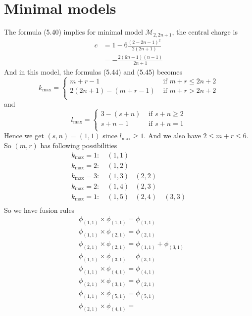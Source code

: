 \section{Minimal models}
The formula (5.40) implies for minimal model $\mathcal{M}_{2,2n+1}$, the central charge is 
\[
\begin{aligned}
c & = 1 - 6 \frac{(2-2n-1)^2}{2(2n+1)}\\
& =  - \frac{2(6n-1)(n-1)}{2n+1}
\end{aligned}
\]
And in this model, the formulas (5.44) and (5.45) becomes
\[
k_{\text{max}} = \begin{cases}
m+r -1 & \text{ if } m+r \leq 2n+2\\
2(2n+1) -(m+r-1) & \text{ if } m+r > 2n+2\\
\end{cases}
\]
and 
\[
l_{\text{max}} = \begin{cases}
3-(s+n) & \text{ if } s+n \geq 2\\
s+n-1& \text{ if } s+n = 1 \\
\end{cases}
\]
Hence we get $(s,n)= (1,1)$ since $l_{\text{max}} \geq 1$. And we also have $2 \leq m+r \leq 6$. So $(m,r)$ has following possibilities
\[
\begin{aligned}
k_{\text{max}}= 1:\ &(1,1) & &\\
k_{\text{max}}= 2:\ &(1,2) & &\\
k_{\text{max}}= 3:\ &(1,3) &(2,2)&\\
k_{\text{max}}= 2:\ &(1,4) & (2,3)&\\
k_{\text{max}}= 1:\ &(1,5) & (2,4) &\ (3,3)\\
\end{aligned}
\]
So we have fusion rules
\[
\begin{aligned}
 &\phi_{(1,1)} \times \phi_{(1,1)} = \phi_{(1,1)}\\
 & \phi_{(1,1)} \times \phi_{(2,1)} = \phi_{(2,1)}\\
 & \phi_{(2,1)} \times \phi_{(2,1)} = \phi_{(1,1)} + \phi_{(3,1)}\\
 & \phi_{(1,1)} \times \phi_{(3,1)} = \phi_{(3,1)}\\
 & \phi_{(1,1)} \times \phi_{(4,1)} = \phi_{(4,1)} \\
 & \phi_{(2,1)} \times \phi_{(3,1)} = \phi_{(2,1)} \\
 & \phi_{(1,1)} \times \phi_{(5,1)} = \phi_{(5,1)} \\
 & \phi_{(2,1)} \times \phi_{(4,1)} = \
\end{aligned}
\]